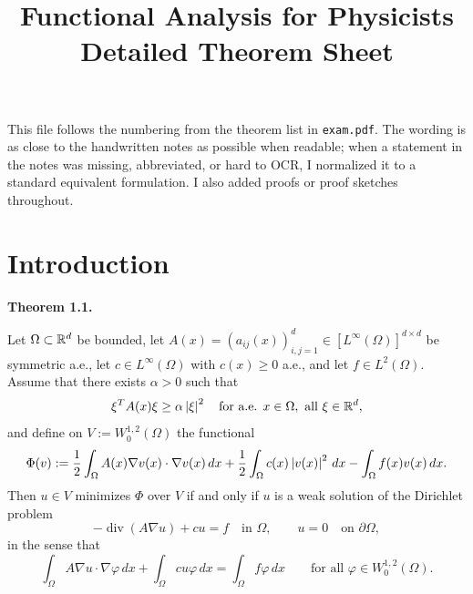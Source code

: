 \documentclass[11pt]{article}
\title{Functional Analysis for Physicists\\Detailed Theorem Sheet}
\author{}
\date{}
\newenvironment{theoremstmt}[1]{%
  \par\medskip\noindent\textbf{Theorem #1. }\itshape
}{\par\medskip}
\begin{document}
\maketitle

This file follows the numbering from the theorem list in \texttt{exam.pdf}. The wording is as close to the handwritten notes as possible when readable; when a statement in the notes was missing, abbreviated, or hard to OCR, I normalized it to a standard equivalent formulation. I also added proofs or proof sketches throughout.

\tableofcontents
\clearpage

\section{Introduction}

\begin{theoremstmt}{1.1}
Let $\Omega\subset\mathbb{R}^d$ be bounded, let $A(x)=(a_{ij}(x))_{i,j=1}^d\in [L^\infty(\Omega)]^{d\times d}$ be symmetric a.e., let $c\in L^\infty(\Omega)$ with $c(x)\ge 0$ a.e., and let $f\in L^2(\Omega)$. Assume that there exists $\alpha>0$ such that
\[
\xi^T A(x) \xi \ge \alpha \left\lvert \xi\right\rvert^2 \quad \text{for a.e. }x\in\Omega,\ \text{all }\xi\in\mathbb{R}^d,
\]
and define on $V:=W^{1,2}_0(\Omega)$ the functional
\[
\Phi(v):=\frac12 \int_{\Omega} A(x)\nabla v(x)\cdot \nabla v(x)\,dx
+\frac12\int_{\Omega} c(x)\left\lvert v(x)\right\rvert^2\,dx
-\int_{\Omega} f(x)v(x)\,dx.
\]
Then $u\in V$ minimizes $\Phi$ over $V$ if and only if $u$ is a weak solution of the Dirichlet problem
\[
-\operatorname{div}(A\nabla u)+cu=f \quad \text{in }\Omega,
\qquad
u=0 \quad \text{on }\partial\Omega,
\]
in the sense that
\[
\int_{\Omega} A\nabla u\cdot \nabla \varphi\,dx
+\int_{\Omega} cu\varphi\,dx
=\int_{\Omega} f\varphi\,dx
\qquad\text{for all }\varphi\in W^{1,2}_0(\Omega).
\]
\end{theoremstmt}
\end{document}
